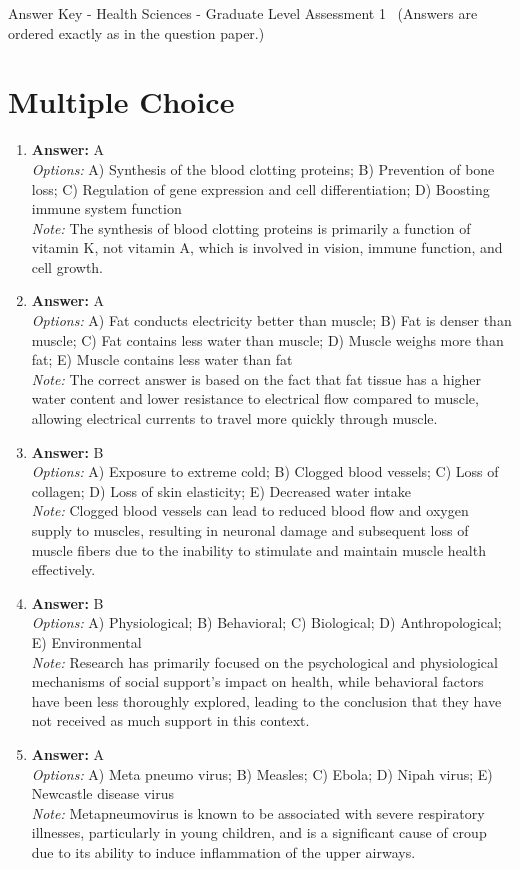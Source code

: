 \documentclass[12pt]{article}
\begin{document}
\begin{center}
Answer Key - Health Sciences - Graduate Level Assessment 1 \
\small (Answers are ordered exactly as in the question paper.)
\end{center}

\section*{Multiple Choice}
\begin{enumerate}[label=\arabic*.]
\item \textbf{Answer:} A
\\ \textit{Options:} A) Synthesis of the blood clotting proteins; B) Prevention of bone loss; C) Regulation of gene expression and cell differentiation; D) Boosting immune system function
\\ \textit{Note:} The synthesis of blood clotting proteins is primarily a function of vitamin K, not vitamin A, which is involved in vision, immune function, and cell growth.
\item \textbf{Answer:} A
\\ \textit{Options:} A) Fat conducts electricity better than muscle; B) Fat is denser than muscle; C) Fat contains less water than muscle; D) Muscle weighs more than fat; E) Muscle contains less water than fat
\\ \textit{Note:} The correct answer is based on the fact that fat tissue has a higher water content and lower resistance to electrical flow compared to muscle, allowing electrical currents to travel more quickly through muscle.
\item \textbf{Answer:} B
\\ \textit{Options:} A) Exposure to extreme cold; B) Clogged blood vessels; C) Loss of collagen; D) Loss of skin elasticity; E) Decreased water intake
\\ \textit{Note:} Clogged blood vessels can lead to reduced blood flow and oxygen supply to muscles, resulting in neuronal damage and subsequent loss of muscle fibers due to the inability to stimulate and maintain muscle health effectively.
\item \textbf{Answer:} B
\\ \textit{Options:} A) Physiological; B) Behavioral; C) Biological; D) Anthropological; E) Environmental
\\ \textit{Note:} Research has primarily focused on the psychological and physiological mechanisms of social support's impact on health, while behavioral factors have been less thoroughly explored, leading to the conclusion that they have not received as much support in this context.
\item \textbf{Answer:} A
\\ \textit{Options:} A) Meta pneumo virus; B) Measles; C) Ebola; D) Nipah virus; E) Newcastle disease virus
\\ \textit{Note:} Metapneumovirus is known to be associated with severe respiratory illnesses, particularly in young children, and is a significant cause of croup due to its ability to induce inflammation of the upper airways.
\end{enumerate}
\end{document}
